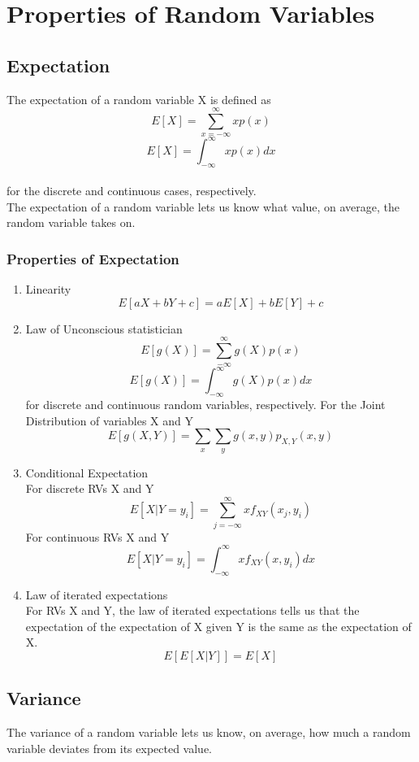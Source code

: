 \documentclass{article}
\begin{document}
\section{Properties of Random Variables}

\subsection{Expectation}

The expectation of a random variable X is defined as  
$$E[X] = \sum_{x = -\infty}^{\infty}xp(x)$$ 
$$E[X] = \int_{-\infty}^{\infty}xp(x)dx$$ \\
for the discrete and continuous cases, respectively. \\
The expectation of a random variable lets us know what value, on average, the random variable takes on. 
\subsubsection{Properties of Expectation}
\begin{enumerate}
    \item Linearity \\
    $$E[aX +bY +c] = aE[X] + bE[Y] + c$$
    
    \item Law of Unconscious statistician \\
    $$E[g(X)] = \sum_{-\infty}^{\infty}g(X)p(x)$$ 
    $$E[g(X)] = \int_{-\infty}^{\infty}g(X)p(x)dx$$ 
    for discrete and continuous random variables, respectively.
    For the Joint Distribution of variables X and Y
    $$E[g(X,Y)] = \sum_x\sum_yg(x,y)p_{X,Y}(x,y)$$

    \item Conditional Expectation \\
    For discrete RVs X and Y 
    $$E[X | Y = y_i] = \sum_{j = -\infty}^{\infty} xf_{XY}(x_j, y_i)$$
    For continuous RVs X and Y
    $$E[X | Y = y_i] = \int_{-\infty}^{\infty} xf_{XY}(x, y_i) dx$$

    \item Law of iterated expectations \\
    For RVs X and Y, the law of iterated expectations tells us that the expectation of the expectation of X given Y is the same as the expectation of X.
    $$E[E[X|Y]] = E[X]$$

\end{enumerate}

\subsection{Variance}
The variance of a random variable lets us know, on average, how much a random variable deviates from its expected value. 
\end{document}
